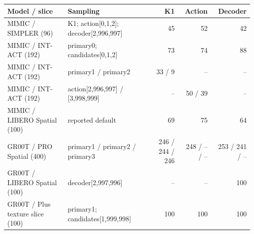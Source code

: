 \begin{tabular}{llrrr}
\toprule
Model / slice & Sampling & K1 & Action & Decoder \\
\midrule
MIMIC / SIMPLER (96) & K1; action[0,1,2]; decoder[2,996,997] & 45 & 52 & 42 \\
MIMIC / INT-ACT (192) & primary0; candidates[0,1,2] & 73 & 74 & 88 \\
MIMIC / INT-ACT (192) & primary1 / primary2 & 33 / 9 & -- & -- \\
MIMIC / INT-ACT (192) & action[2,996,997] / [3,998,999] & -- & 50 / 39 & -- \\
MIMIC / LIBERO Spatial (100) & reported default & 69 & 75 & 64 \\
GR00T / PRO Spatial (400) & primary1 / primary2 / primary3 & 246 / 244 / 246 & 248 / -- / -- & 253 / 241 / -- \\
GR00T / LIBERO Spatial (100) & decoder[2,997,996] & -- & -- & 100 \\
GR00T / Plus texture slice (100) & primary1; candidates[1,999,998] & 100 & 100 & 100 \\
\bottomrule
\end{tabular}
